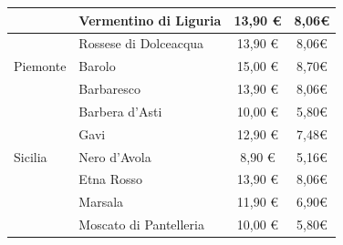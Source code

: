 \documentclass[12pt, a4paper]{article}
\begin{document}
\begin{longtable}{@{}|l|l|c|c|}
& Vermentino di Liguria                                                     & 13,90 €                                                         & 8,06€                                                                                 \\ \hline
& Rossese di Dolceacqua                                                     & 13,90 €                                                         & 8,06€                                                                                 \\ \hline
Piemonte             & Barolo                                                                    & 15,00 €                                                         & 8,70€                                                                                 \\ \hline
& Barbaresco                                                                & 13,90 €                                                         & 8,06€                                                                                 \\ \hline
& Barbera d'Asti                                                            & 10,00 €                                                         & 5,80€                                                                                 \\ \hline
& Gavi                                                                      & 12,90 €                                                         & 7,48€                                                                                 \\ \hline
Sicilia              & Nero d'Avola                                                              & 8,90 €                                                          & 5,16€                                                                                 \\ \hline
& Etna Rosso                                                                & 13,90 €                                                         & 8,06€                                                                                 \\ \hline
& Marsala                                                                   & 11,90 €                                                         & 6,90€                                                                                 \\ \hline
& Moscato di Pantelleria                                                    & 10,00 €                                                         & 5,80€                                                                                 \\ \hline

\end{longtable}
\end{document}
